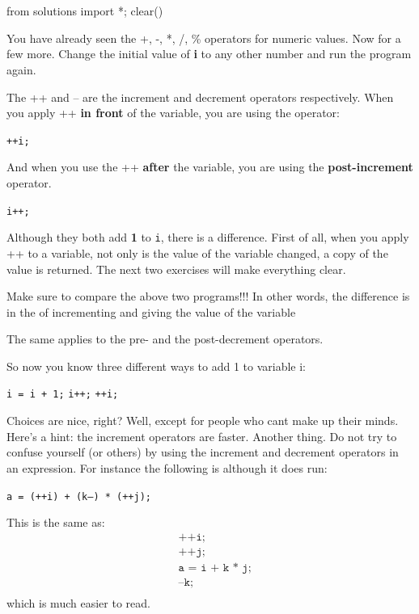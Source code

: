 \\\\
\begin{python0}
from solutions import *; clear()
\end{python0}
You have already seen the +, -, *, /, \% operators for numeric values.
Now for a few more.
Change the initial value of \textbf{i} to any other number and run the program again.

The ++ and -- are the increment and decrement operators respectively. When you apply ++ \textbf{in front} of the variable, you are using the  operator:\\
\begin{center}
  \texttt{++i;}
\end{center}

And when you use the ++ \textbf{after} the variable, you are using the \textbf{post-increment} operator.
\begin{center}
  \texttt{i++;}
\end{center}

Although they both add \textbf{1} to \texttt{i}, there is a difference. First of all, when you apply ++ to a variable, not only is the value of the variable changed, a copy of the value is returned. The next two exercises will make
everything clear.

Make sure to compare the above two programs!!!
In other words, the difference is in the  of incrementing and giving the value of the variable

The same applies to the pre- and the post-decrement operators.

So now you know three different ways to add 1 to variable i:
\begin{center}
 \texttt{i = i + 1;}        \texttt{i++;}        \texttt{++i;}
\end{center}

Choices are nice, right? Well, except for people who cant make up their minds. Here's a hint: the increment operators are faster.
Another thing. Do not try to confuse yourself (or others) by using the increment and decrement operators in an expression. For instance the following is  although it does run:
\begin{center}
\texttt{a = (++i) + (k--) * (++j);}
\end{center}
This is the same as:
\begin{align*}
&\texttt{++i;}\\
&\texttt{++j;}\\
&\texttt{a = i + k * j;}\\
&\texttt{--k;}\\
\end{align*}
which is much easier to read.

